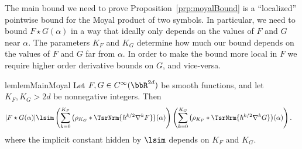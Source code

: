 \documentclass{article}
\numberwithin{equation}{section}
\begin{document}
The main bound we need to prove Proposition~\ref{prp:moyalBound} is a ``localized'' pointwise
bound for the Moyal product of two symbols.  In particular,
we need to bound $F\star G(\alpha)$ in a way that ideally
only depends on the values of $F$ and $G$ near $\alpha$.   The parameters $K_F$ and $K_G$ determine how much our bound depends
on the values of $F$ and $G$ far from $\alpha$.   In order 
to make the bound more local in $F$ we require higher order
derivative bounds on $G$, and vice-versa.
\begin{restatable}{lem}{lemMainMoyal}
	\label{lem:main-moyal}
	Let $F,G\in C^\infty(\bbR^{2d})$ be smooth functions,
	and let $K_F,K_G > 2d$ be nonnegative integers.  Then
	\begin{equation}
		\label{eq:main-moyal-bd}
		\begin{split}
			|F\star G(\alpha)|
			&\lsim			\left(\sum_{k=0}^{K_F}\big(\rho_{K_G}\ast \TsrNrm{\hbar^{k/2}\nabla^k F}\big)(\alpha)\right)
			\left(\sum_{k=0}^{K_G} \big(\rho_{K_F} \ast \TsrNrm{\hbar^{k/2}\nabla^k G}\big)(\alpha)\right).
		\end{split}
	\end{equation}
 where the implicit constant hidden by $\lsim$ depends on $K_F$ and $K_G$.
\end{restatable}
\end{document}
